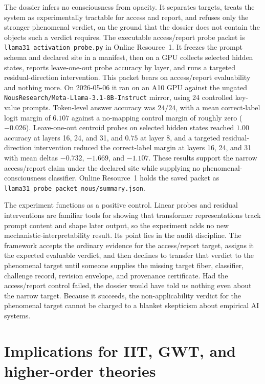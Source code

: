\documentclass[11pt]{article}
\begin{document}
The dossier infers no
consciousness from opacity. It separates targets, treats the system as
experimentally tractable for access and report, and refuses only the stronger
phenomenal verdict, on the ground that the dossier does not contain the objects
such a verdict requires.
The executable access/report probe packet is
\texttt{llama31\_activation\_probe.py} in Online Resource~1.
It freezes the prompt schema and declared site in a manifest, then on a GPU
collects selected hidden states, reports leave-one-out probe accuracy by layer,
and runs a targeted residual-direction intervention.
This packet bears on access/report evaluability and nothing more. On 2026-05-06
it ran on an A10 GPU against the ungated
\texttt{NousResearch/Meta-Llama-3.1-8B-Instruct} mirror, using 24 controlled
key-value prompts. Token-level answer accuracy was $24/24$, with a mean
correct-label logit margin of $6.107$ against a no-mapping control margin of
roughly zero ($-0.026$). Leave-one-out centroid probes on selected hidden states
reached $1.00$ accuracy at layers 16, 24, and 31, and $0.75$ at layer 8, and a
targeted residual-direction intervention reduced the correct-label margin at
layers 16, 24, and 31 with mean deltas $-0.732$, $-1.669$, and $-1.107$. These
results support the narrow access/report claim under the declared site while
supplying no phenomenal-consciousness classifier. Online Resource~1 holds the
saved packet as \texttt{llama31\_probe\_packet\_nous/summary.json}.

The experiment functions as a positive control. Linear probes and residual
interventions are familiar tools for showing that transformer representations
track prompt content and shape later output, so the experiment adds no new
mechanistic-interpretability result. Its point lies in the audit
discipline. The framework
accepts the ordinary evidence for the access/report target, assigns it the
expected evaluable verdict, and then declines to transfer that verdict to the
phenomenal target until someone supplies the missing target fiber, classifier,
challenge record, revision envelope, and provenance certificate. Had the
access/report control failed, the dossier would have told us nothing even about
the narrow target. Because it succeeds, the non-applicability verdict for the
phenomenal target cannot be charged to a blanket skepticism about empirical AI
systems.

\section{Implications for IIT, GWT, and higher-order theories}
\label{sec:implications}
\end{document}
